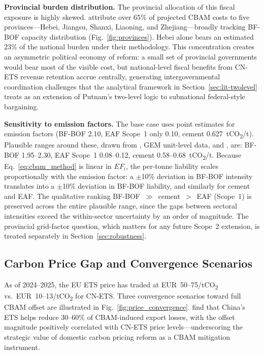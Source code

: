 \documentclass[letterpaper, 10pt, conference]{ieeeconf}
\begin{document}
\textbf{Provincial burden distribution.} The provincial allocation of
this fiscal exposure is highly skewed. \citet{Pan2025} attribute over
65\% of projected CBAM costs to five provinces---Hebei, Jiangsu,
Shanxi, Liaoning, and Zhejiang---broadly tracking BF-BOF capacity
distribution (Fig.~\ref{fig:provinces}). Hebei alone bears an
estimated 23\% of the national burden under their methodology. This
concentration creates an asymmetric political economy of reform: a
small set of provincial governments would bear most of the visible
cost, but national-level fiscal benefits from CN-ETS revenue retention
accrue centrally, generating intergovernmental coordination challenges
that the analytical framework in
Section~\ref{sec:lit-twolevel} treats as an extension of Putnam's
two-level logic to subnational federal-style bargaining.

\textbf{Sensitivity to emission factors.} The base case uses point
estimates for emission factors (BF-BOF 2.10, EAF Scope~1 only 0.10,
cement 0.627~tCO\textsubscript{2}/t). Plausible ranges around these,
drawn from \citet{IEA2023}, GEM unit-level data, and \citet{IPCC2006},
are: BF-BOF 1.95--2.30, EAF Scope~1 0.08--0.12, cement
0.58--0.68~tCO\textsubscript{2}/t. Because Eq.~\ref{eq:cbam_method}
is linear in $EF_i$, the per-tonne liability scales proportionally
with the emission factor: a $\pm$10\% deviation in BF-BOF intensity
translates into a $\pm$10\% deviation in BF-BOF liability, and
similarly for cement and EAF. The qualitative ranking
BF-BOF~$\gg$~cement~$>$~EAF (Scope~1) is preserved across the entire
plausible range, since the gaps between sectoral intensities exceed
the within-sector uncertainty by an order of magnitude. The
provincial grid-factor question, which matters for any future Scope~2
extension, is treated separately in Section~\ref{sec:robustness}.

\subsection{Carbon Price Gap and Convergence Scenarios}

As of 2024--2025, the EU ETS price has traded at
EUR~50--75/tCO\textsubscript{2} vs.\ EUR~10--13/tCO\textsubscript{2}
for CN-ETS. Three convergence scenarios toward full CBAM offset are
illustrated in Fig.~\ref{fig:price_convergence}.
\citet{Li2026} find that China's ETS helps reduce 30--60\% of
CBAM-induced export losses, with the offset magnitude positively correlated
with CN-ETS price levels---underscoring the strategic value of domestic
carbon pricing reform as a CBAM mitigation instrument.
\end{document}
